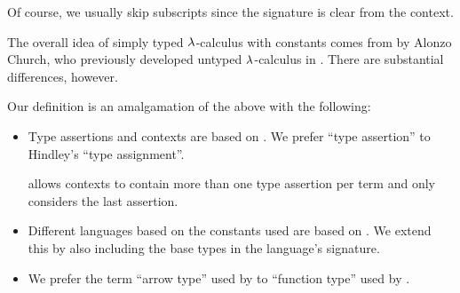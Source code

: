 \begin{comments}
  \item Of course, we usually skip subscripts since the signature is clear from the context.

  \item The overall idea of simply typed \( \mathrm{\lambda} \)-calculus with constants comes from \cite{Church1940STT} by Alonzo Church, who previously developed untyped \( \mathrm{\lambda} \)-calculus in \cite{Church1932Untyped}. There are substantial differences, however.

  Our definition is an amalgamation of the above with the following:
  \begin{itemize}
    \item Type assertions and contexts are based on \cite[def. 2A4]{Hindley1997STT}. We prefer \enquote{type assertion} to Hindley's \enquote{type assignment}.

     allows contexts to contain more than one type assertion per term and only considers the last assertion.

    \item Different languages based on the constants used are based on \cite[5]{Farmer2008STTVirtues}. We extend this by also including the base types in the language's signature.

    \item We prefer the term \enquote{arrow type} used by  to \enquote{function type} used by .
  \end{itemize}
\end{comments}

\begin{remark}\label{rem:dependent_types}
\end{remark}
